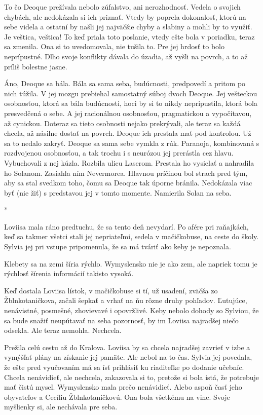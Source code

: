 \documentclass{book}
\begin{document}
To čo Deoque prežívala nebolo zúfalstvo, ani nerozhodnosť. Vedela o svojich chybách, ale nedokázala si ich priznať. Vtedy by poprela dokonalosť, ktorú na sebe videla a ostatní by našli jej najväčšie chyby a slabiny a mohli by to využiť. Je veštica, veštica! To keď priala toto poslanie, vtedy ešte bola v poriadku, teraz sa zmenila. Ona si to uvedomovala, nie tušila to. Pre jej hrdosť to bolo neprípustné. Dlho svoje konflikty dávala do úzadia, až vyšli na povrch, a to až príliš bolestne jasne.

Áno, Deoque sa bála. Bála sa sama seba, budúcnosti, predpovedí a pritom po nich túžila. V jej mozgu prebiehal samostatný súboj dvoch Deoque. Jej vešteckou osobnosťou, ktorá sa bála budúcnosti, hoci by si to nikdy nepripustila, ktorá bola presvedčená o sebe. A jej racionálnou osobnosťou, pragmatickou a vypočítavou, až cynickou. Doteraz sa tieto osobnosti nejako prekrývali, ale teraz sa každá chcela, až násilne dostať na povrch. Deoque ich prestala mať pod kontrolou. Už sa to nedalo zakryť. Deoque sa sama sebe vymkla z rúk. Paranoja, kombinovaná s rozdvojenou osobnosťou, a tak trochu i s neurózou jej prerástla cez hlavu. Vybuchovali z nej kúzla. Rozbila ulicu Laserom. Prestala ho vysielať a nahradila ho Solanom. Zasiahla ním Nevermorea. Hlavnou príčinou bol strach pred tým, aby sa stal svedkom toho, čomu sa Deoque tak úporne bránila. Nedokázala viac byť (nie žiť) s predstavou jej v tomto momente. Namierila Solan na seba.

\begin{center}
*
\end{center}

Loviisa mala ráno predtuchu, že sa tento deň nevydarí. Po afére pri raňajkách, keď sa takmer všetci stali jej nepriateľmi, sedela v mačičkobuse, na ceste do školy. Sylvia jej pri vstupe pripomenula, že sa má tváriť ako keby je nepoznala. 

Klebety sa na zemi šíria rýchlo. Wymyslensko nie je ako zem, ale napriek tomu je rýchlosť šírenia informácií takisto vysoká.

Keď dostala Loviisa lístok, v mačičkobuse si tí, už usadení, zväčša zo Žblnkotaničkova, začali šepkať a vrhať na ňu rôzne druhy pohľadov. Ľutujúce, nenávistné, posmešné, zhovievavé i opovržlivé. Keby nebolo dohody so Sylviou, že sa bude snažiť neupútavať na seba pozornosť, by im Loviisa najradšej niečo odsekla. Ale teraz nemohla. Nechcela.

Prežila celú cestu až do Kralova. Loviisa by sa chcela najradšej zavrieť v izbe a vymýšľať plány na získanie jej pamäte. Ale nebol na to čas. Sylvia jej povedala, že ešte pred vyučovaním má sa ísť prihlásiť ku riaditeľke po dodanie učebníc. Chcela nenávidieť, ale nechcela, zakazovala si to, pretože si bola istá, že potrebuje mať čistú myseľ. Wymyslensko mala prečo nenávidieť. Alebo aspoň časť jeho obyvateľov a Cecíliu Žblnkotaničkovú. Ona bola všetkému na vine. Svoje myšlienky si, ale nechávala pre seba.
\end{document}
